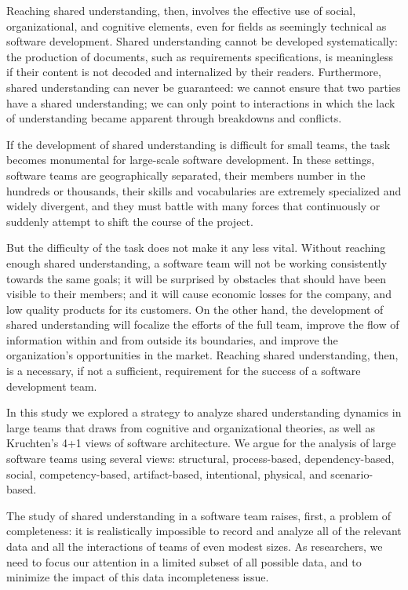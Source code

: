 Reaching shared understanding, then, involves the effective use of social, organizational, and cognitive elements, even for fields as seemingly technical as software development. Shared understanding cannot be developed systematically: the production of documents, such as requirements specifications, is meaningless if their content is not decoded and internalized by their readers. Furthermore, shared understanding can never be guaranteed: we cannot ensure that two parties have a shared understanding; we can only point to interactions in which the lack of understanding became apparent through breakdowns and conflicts.

If the development of shared understanding is difficult for small teams, the task becomes monumental for large-scale software development. In these settings, software teams are geographically separated, their members number in the hundreds or thousands, their skills and vocabularies are extremely specialized and widely divergent, and they must battle with many forces that continuously or suddenly attempt to shift the course of the project.

But the difficulty of the task does not make it any less vital. Without reaching enough shared understanding, a software team will not be working consistently towards the same goals; it will be surprised by obstacles that should have been visible to their members; and it will cause economic losses for the company, and low quality products for its customers. On the other hand, the development of shared understanding will focalize the efforts of the full team, improve the flow of information within and from outside its boundaries, and improve the organization's opportunities in the market. Reaching shared understanding, then, is a necessary, if not a sufficient, requirement for the success of a software development team.

In this study we explored a strategy to analyze shared understanding dynamics in large teams that draws from cognitive and organizational theories, as well as Kruchten's 4+1 views of software architecture. We argue for the analysis of large software teams using several views: structural, process-based, dependency-based, social, competency-based, artifact-based, intentional, physical, and scenario-based. 

The study of shared understanding in a software team raises, first, a problem of completeness: it is realistically impossible to record and analyze all of the relevant data and all the interactions of teams of even modest sizes. As researchers, we need to focus our attention in a limited subset of all possible data, and to minimize the impact of this data incompleteness issue.

